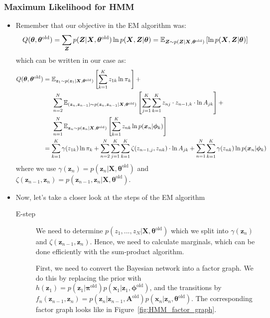 \subsubsection{Maximum Likelihood for HMM}
\begin{itemize}
	\item Remember that our objective in the EM algorithm was:
	$$Q(\bm{\theta}, \bm{\theta}^{\text{old}})=\sum_{\bm{Z}} p(\bm{Z}|\bm{X},\bm{\theta}^{\text{old}})\ln p(\bm{X},\bm{Z}|\bm{\theta})=\mathbb{E}_{\bm{Z}\sim p(\bm{Z}|\bm{X},\bm{\theta}^{\text{old}})}\left[\ln p(\bm{X},\bm{Z}|\bm{\theta})\right]$$
	which can be written in our case as:
	\begin{equation*}
		\begin{split}
			Q(\bm{\theta}, \bm{\theta}^{\text{old}}) & = \mathbb{E}_{\bm{z}_1\sim p(\bm{z}_1|\bm{X},\bm{\theta}^{\text{old}})}\left[\sum_{k=1}^{K} z_{1k}\ln \pi_k\right] + \\
			& \hspace{5mm}\sum_{n=2}^{N} \mathbb{E}_{(\bm{z}_n, \bm{z}_{n-1})\sim p(\bm{z}_n, \bm{z}_{n-1}|\bm{X},\bm{\theta}^{\text{old}})}\left[\sum_{j=1}^{K}\sum_{k=1}^{K}z_{nj}\cdot z_{n-1,k}\cdot \ln A_{jk}\right] + \\
			& \hspace{5mm} \sum_{n=1}^{N} \mathbb{E}_{\bm{z}_n\sim p(\bm{z}_n|\bm{X},\bm{\theta}^{\text{old}})} \left[\sum_{k=1}^{K} z_{nk} \ln p(\bm{x}_n|\bm{\phi}_k)\right]\\
			& = \sum_{k=1}^{K} \gamma(z_{1k})\ln \pi_k + \sum_{n=2}^{N} \sum_{j=1}^{K}\sum_{k=1}^{K}\zeta(z_{n-1,j}, z_{nk})\cdot \ln A_{jk} + \sum_{n=1}^{N} \sum_{k=1}^{K} \gamma(z_{nk})\ln p(\bm{x}_n|\bm{\phi}_k)
		\end{split}
	\end{equation*}
	where we use $\gamma(\bm{z}_n)=p(\bm{z}_n|\bm{X},\bm{\theta}^{\text{old}})$ and $\zeta(\bm{z}_{n-1},\bm{z}_n)=p(\bm{z}_{n-1},\bm{z}_{n}|\bm{X},\bm{\theta}^{\text{old}})$.
	\item Now, let's take a closer look at the steps of the EM algorithm
	\begin{description}
		\item[E-step] We need to determine $p(z_1,...,z_N|\bm{X},\bm{\theta}^{\text{old}})$ which we split into $\gamma(\bm{z}_n)$ and $\zeta(\bm{z}_{n-1},\bm{z}_n)$. Hence, we need to calculate marginals, which can be done efficiently with the sum-product algorithm.
		
		First, we need to convert the Bayesian network into a factor graph. We do this by replacing the prior with  $h(\bm{z}_1)=p(\bm{z}_1|\bm{\pi}^{\text{old}})p(\bm{x}_1|\bm{z}_1, \bm{\phi}^{\text{old}})$, and the transitions by $f_n(\bm{z}_{n-1},\bm{z}_n)=p(\bm{z}_n|\bm{z}_{n-1}, \bm{A}^{\text{old}})p(\bm{x}_n|\bm{z}_n,\bm{\theta}^{\text{old}})$. The corresponding factor graph looks like in Figure~\ref{fig:HMM_factor_graph}.
		

\end{description}
\end{itemize}
